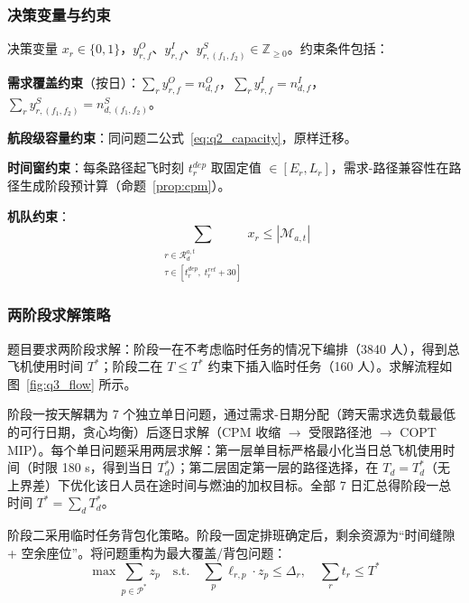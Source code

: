 
\subsubsection{决策变量与约束}

决策变量 $x_r \in \{0,1\}$，$y^{O}_{r,f}$、$y^{I}_{r,f}$、$y^{S}_{r,(f_1,f_2)} \in \mathbb{Z}_{\geq 0}$。约束条件包括：

\textbf{需求覆盖约束}（按日）：$\sum_{r} y^{O}_{r,f} = n^{O}_{d,f}$，$\sum_{r} y^{I}_{r,f} = n^{I}_{d,f}$，$\sum_{r} y^{S}_{r,(f_1,f_2)} = n^{S}_{d,(f_1,f_2)}$。

\textbf{航段级容量约束}：同问题二公式~\eqref{eq:q2_capacity}，原样迁移。

\textbf{时间窗约束}：每条路径起飞时刻 $t^{dep}_r$ 取固定值 $\in [E_r, L_r]$，需求-路径兼容性在路径生成阶段预计算（命题~\ref{prop:cpm}）。

\textbf{机队约束}：
\begin{equation}
\sum_{\substack{r \in \mathcal{R}^{a,t}_d \\ \tau \in [t^{dep}_r,\; t^{ret}_r + 30]}} x_r \leq |\mathcal{M}_{a,t}|
\label{eq:q3_fleet}
\end{equation}

\subsubsection{两阶段求解策略}

题目要求两阶段求解：阶段一在不考虑临时任务的情况下编排（3840 人），得到总飞机使用时间 $T^*$；阶段二在 $T \leq T^*$ 约束下插入临时任务（160 人）。求解流程如图~\ref{fig:q3_flow} 所示。



阶段一按天解耦为 7 个独立单日问题，通过需求-日期分配（跨天需求选负载最低的可行日期，贪心均衡）后逐日求解（CPM 收缩 $\to$ 受限路径池 $\to$ COPT MIP）。每个单日问题采用两层求解：第一层单目标严格最小化当日总飞机使用时间（时限 180 s，得到当日 $T^*_d$）；第二层固定第一层的路径选择，在 $T_d = T^*_d$（无上界差）下优化该日人员在途时间与燃油的加权目标。全部 7 日汇总得阶段一总时间 $T^* = \sum_d T^*_d$。

阶段二采用临时任务背包化策略。阶段一固定排班确定后，剩余资源为``时间缝隙 + 空余座位''。将问题重构为最大覆盖/背包问题：
\begin{equation}
\max \sum_{p \in \mathcal{P}^{*}} z_p \quad \text{s.t.} \quad \sum_{p} \ell_{r,p} \cdot z_p \leq \Delta_r, \quad \sum_r t_r \leq T^*
\label{eq:q3_knapsack}
\end{equation}

